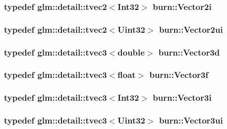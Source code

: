 \hypertarget{namespaceburn_afb9df6e019eb84491abb84140b4da64e}{
\subsubsection[{Vector2i}]{\setlength{\rightskip}{0pt plus 5cm}typedef glm\-::detail\-::tvec2$<${\bf Int32}$>$ {\bf burn\-::\-Vector2i}}}\label{namespaceburn_afb9df6e019eb84491abb84140b4da64e}
\hypertarget{namespaceburn_a6805fa33c49c4c3db88a7bebba2c408f}{
\subsubsection[{Vector2ui}]{\setlength{\rightskip}{0pt plus 5cm}typedef glm\-::detail\-::tvec2$<${\bf Uint32}$>$ {\bf burn\-::\-Vector2ui}}}\label{namespaceburn_a6805fa33c49c4c3db88a7bebba2c408f}
\hypertarget{namespaceburn_a8832d94f1b12cd81bb8473a27a843930}{
\subsubsection[{Vector3d}]{\setlength{\rightskip}{0pt plus 5cm}typedef glm\-::detail\-::tvec3$<$double$>$ {\bf burn\-::\-Vector3d}}}\label{namespaceburn_a8832d94f1b12cd81bb8473a27a843930}
\hypertarget{namespaceburn_afdd7cfb352b9612432faf6947b6fff74}{
\subsubsection[{Vector3f}]{\setlength{\rightskip}{0pt plus 5cm}typedef glm\-::detail\-::tvec3$<$float$>$ {\bf burn\-::\-Vector3f}}}\label{namespaceburn_afdd7cfb352b9612432faf6947b6fff74}
\hypertarget{namespaceburn_ae3588b23ec9999532c43728cae59bde5}{
\subsubsection[{Vector3i}]{\setlength{\rightskip}{0pt plus 5cm}typedef glm\-::detail\-::tvec3$<${\bf Int32}$>$ {\bf burn\-::\-Vector3i}}}\label{namespaceburn_ae3588b23ec9999532c43728cae59bde5}
\hypertarget{namespaceburn_aa4ef7f734ba1ec7e71c01692910cc5f8}{
\subsubsection[{Vector3ui}]{\setlength{\rightskip}{0pt plus 5cm}typedef glm\-::detail\-::tvec3$<${\bf Uint32}$>$ {\bf burn\-::\-Vector3ui}}}\label{namespaceburn_aa4ef7f734ba1ec7e71c01692910cc5f8}

